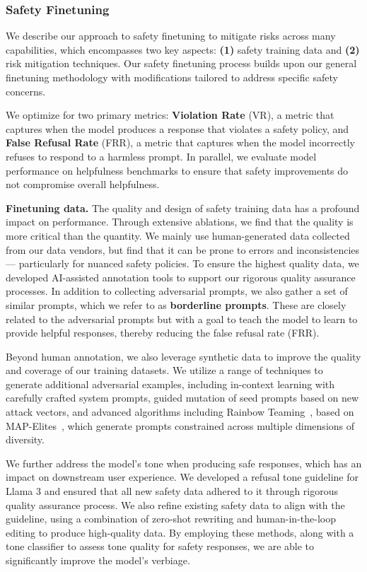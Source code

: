 \subsubsection{Safety Finetuning}

We describe our approach to safety finetuning to mitigate risks across many capabilities, which encompasses two key aspects: \textbf{(1)} safety training data and \textbf{(2)} risk mitigation techniques. Our safety finetuning process builds upon our general finetuning methodology with modifications tailored to address specific safety concerns.

We optimize for two primary metrics: \textbf{Violation Rate} (VR), a metric that captures when the model produces a response that violates a safety policy, and \textbf{False Refusal Rate} (FRR), a metric that captures when the model incorrectly refuses to respond to a harmless prompt.  In parallel, we evaluate model performance on helpfulness benchmarks to ensure that safety improvements do not compromise overall helpfulness.

\textbf{Finetuning data.} The quality and design of safety training data has a profound impact on performance. Through extensive ablations, we find that the quality is more critical than the quantity. We mainly use human-generated data collected from our data vendors, but find that it can be prone to errors and inconsistencies --- particularly for nuanced safety policies. To ensure the highest quality data, we developed AI-assisted annotation tools to support our rigorous quality assurance processes. In addition to collecting adversarial prompts, we also gather a set of similar prompts, which we refer to as \textbf{borderline prompts}. These are closely related to the adversarial prompts but with a goal to teach the model to learn to provide helpful responses, thereby reducing the false refusal rate (FRR).

Beyond human annotation, we also leverage synthetic data to improve the quality and coverage of our training datasets. We utilize a range of techniques to generate additional adversarial examples, including in-context learning with carefully crafted system prompts, guided mutation of seed prompts based on new attack vectors, and advanced algorithms including Rainbow Teaming~\citep{samvelyan2024rainbowteamingopenendedgeneration}, based on MAP-Elites~\citep{mouret2015illuminatingsearchspacesmapping}, which generate prompts constrained across multiple dimensions of diversity.

We further address the model's tone when producing safe responses, which has an impact on downstream user experience. We developed a refusal tone guideline for Llama 3 and ensured that all new safety data adhered to it through rigorous quality assurance process. We also refine existing safety data to align with the guideline, using a combination of zero-shot rewriting and human-in-the-loop editing to produce high-quality data. By employing these methods, along with a tone classifier to assess tone quality for safety responses, we are able to significantly improve the model's verbiage. 

